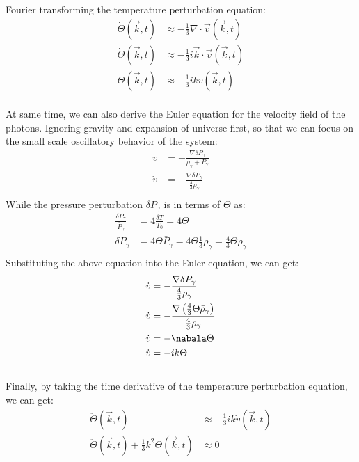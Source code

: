 \clearpage
\begin{foundation}
    Fourier transforming the temperature perturbation equation:
    \begin{align*}
        \dot{\Theta}(\vec{k},t) &\approx - \frac{1}{3} \nabla \cdot \vec{v}(\vec{k},t) \\
        \dot{\Theta}(\vec{k},t) &\approx - \frac{1}{3} i \vec{k} \cdot \vec{v}(\vec{k},t) \\
        \dot{\Theta}(\vec{k},t) &\approx - \frac{1}{3} i k v(\vec{k},t)
    \end{align*} \\

    At same time, we can also derive the Euler equation for the velocity field of the photons. Ignoring gravity and expansion of universe first, so that we can focus on the small scale oscillatory behavior of the system:
    \begin{align*}
        \dot{v} &= - \frac{\nabla \delta P_\gamma}{\rho_\gamma + P_\gamma} \\
        \dot{v} &= - \frac{\nabla \delta P_\gamma}{\frac{4}{3} \rho_\gamma} \\
    \end{align*}
    While the pressure perturbation $\delta P_\gamma$ is in terms of $\Theta$ as:
    \begin{align*}
        \frac{\delta P_\gamma}{\bar{P}_\gamma} &= 4 \frac{\delta T}{T_0} = 4 \Theta \\
        \delta P_\gamma &= 4 \Theta \bar{P}_\gamma = 4 \Theta \frac{1}{3} \bar{\rho}_\gamma = \frac{4}{3} \Theta \bar{\rho}_\gamma\\
    \end{align*}
    Substituting the above equation into the Euler equation, we can get:
    \begin{align*}
        \dot{v} &= - \frac{\nabla \delta P_\gamma}{\frac{4}{3} \rho_\gamma} \\
        \dot{v} &= - \frac{\nabla \left( \frac{4}{3} \Theta \bar{\rho}_\gamma \right)}{\frac{4}{3} \rho_\gamma} \\
        \dot{v} &= - \nabala \Theta \\
        \dot{v} &= - i k \Theta
    \end{align*} \\

    Finally, by taking the time derivative of the temperature perturbation equation, we can get:
    \begin{align*}
        \ddot{\Theta}(\vec{k},t) &\approx - \frac{1}{3} i k \dot{v}(\vec{k},t) \\
        \ddot{\Theta}(\vec{k},t) + \frac{1}{3} k^2 \Theta(\vec{k},t) &\approx 0
    \end{align*}
\end{foundation}

